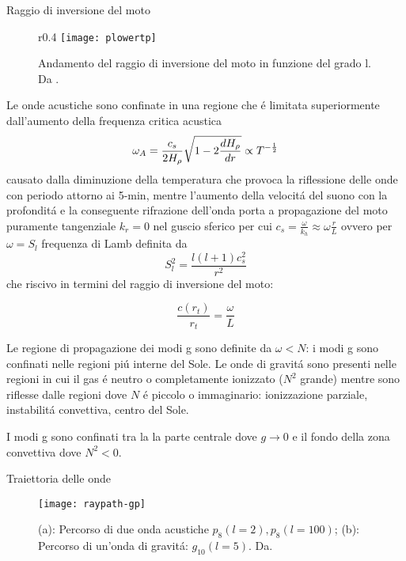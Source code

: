 \begin{frame}{Raggio di inversione del moto}

\begin{figure}[17]{r}{0.4\textwidth}
\centering
\texttt{[image: plowertp]}
\caption{Andamento del raggio di inversione del moto in funzione del grado l. Da \cite{dal03notes}.}\label{fig:plowertp}
\end{figure}

Le onde acustiche sono confinate in una regione che \'e limitata superiormente dall'aumento della frequenza critica acustica
\begin{equation}
\omega_A=\frac{c_s}{2H_{\rho}{}}\sqrt{1-2\frac{d H_{\rho}{}}{d r}}\propto T^{-\frac{1}{2}}\label{eq:acusticcutoff}
\end{equation}
 causato dalla diminuzione della temperatura che provoca la riflessione delle onde con periodo attorno ai 5-min, mentre l'aumento della velocit\'a del suono con la profondit\'a e la conseguente rifrazione dell'onda porta a propagazione del moto puramente tangenziale $k_r=0$ nel guscio sferico per cui $c_s=\frac{\omega}{k_h}\approx\omega \frac{r}{L}$ ovvero per $\omega=S_l$ frequenza di Lamb definita da
\begin{equation}
S_l^2=\frac{l(l+1)c_s^2}{r^2}\label{eq:Lambf}
\end{equation}
che riscivo in termini del raggio di inversione del moto:

\begin{equation}
\frac{c(r_t)}{r_t}=\frac{\omega}{L}
\end{equation}

Le regione di propagazione dei modi g sono definite da $\omega<N$: i modi g sono confinati nelle regioni pi\'u interne del Sole.
Le onde di gravit\'a sono presenti nelle regioni in cui il gas \'e neutro o completamente ionizzato ($N^2$ grande) mentre sono riflesse dalle regioni dove $N$ \'e piccolo o immaginario: ionizzazione parziale, instabilit\'a convettiva, centro del Sole.

I modi g sono confinati tra la la parte centrale dove $g\to0$ e il fondo della zona convettiva dove $N^2<0$.

\end{frame}

\begin{frame}{Traiettoria delle onde}

\begin{figure}[!ht]
\texttt{[image: raypath-gp]}
\caption{(a): Percorso di due onda acustiche $p_8(l=2), p_8(l=100)$; (b): Percorso di un'onda di gravit\'a: $g_{10}(l=5)$. Da\cite{gou91seismic}.}
\end{figure}

\end{frame}

